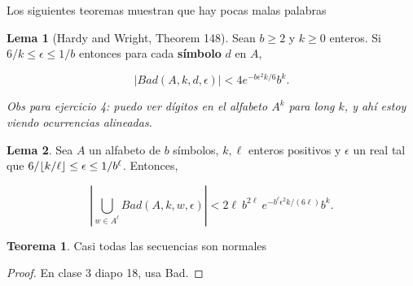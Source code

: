 \documentclass{report}
\theoremstyle{definition} %
\newtheorem{theorem}{Teorema}[chapter]
\newtheorem{lemma}{Lema}[chapter]
\DeclarePairedDelimiter\floor{\lfloor}{\rfloor}
\begin{document}
Los siguientes teoremas muestran que hay pocas malas palabras

\begin{lemma}[Hardy and Wright, Theorem 148]\label{lemma:bad-digit-bound}
    Sean $b \geq 2$ y $k \geq 0$ enteros. Si $6/k \leq \epsilon \leq 1/b$
    entonces para cada \textbf{símbolo} $d$ en $A$,

    $$|Bad(A, k, d, \epsilon)| < 4e^{-b\epsilon^2 k/6}b^k.$$
\end{lemma}

\textit{Obs para ejercicio 4: puedo ver dígitos en el alfabeto $A^k$ para long $k$, y ahí estoy viendo ocurrencias alineadas.}

\begin{lemma}
    Sea $A$ un alfabeto de $b$ símbolos, $k, \ell$ enteros positivos y
    $\epsilon$ un real tal que $6/\floor{k / \ell} \leq \epsilon \leq 1/b^\ell$.
    Entonces,

    $$\left| \bigcup_{w \in A^\ell} Bad(A, k, w, \epsilon) \right|
    < 2\ell\ b^{2\ell}\ e^{-b^\ell \epsilon^2k/(6\ell)}b^k.$$
\end{lemma}

\begin{theorem}
    Casi todas las secuencias son normales
\end{theorem}
\begin{proof}
    En clase 3 diapo 18, usa Bad.
\end{proof}
\end{document}
